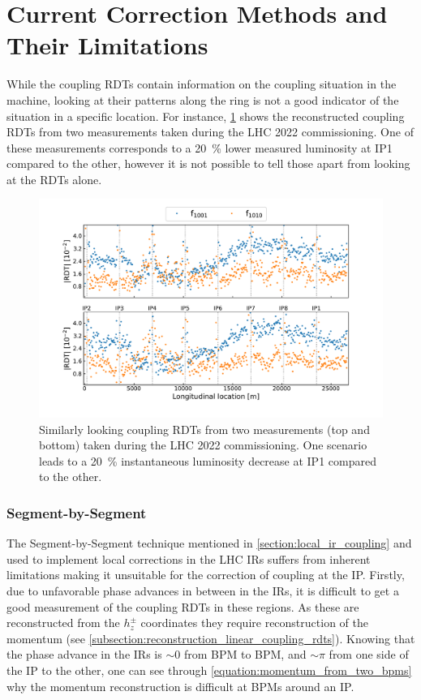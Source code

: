 \section{Current Correction Methods and Their Limitations}
\label{section:current_correction_methods_and_their_limitations}

While the coupling \glspl{RDT} contain information on the coupling situation in the machine, looking at their patterns along the ring is not a good indicator of the situation in a specific location.
For instance, \cref{figure:guess_rdts} shows the reconstructed coupling RDTs from two measurements taken during the LHC \num{2022} commissioning.
One of these measurements corresponds to a \qty{20}{\percent} lower measured luminosity at IP\num{1} compared to the other, however it is not possible to tell those apart from looking at the RDTs alone.

\begin{figure}[!htb]
    \centering
    \includegraphics*[width=\linewidth]{Figures/IR_Coupling_Correction/similar_rdts_different_ip1_lumi.pdf}
    \caption{Similarly looking coupling RDTs from two measurements (top and bottom) taken during the LHC \num{2022} commissioning. One scenario leads to a \qty{20}{\percent} instantaneous luminosity decrease at IP\num{1} compared to the other.}
    \label{figure:guess_rdts}
\end{figure}

\subsubsection*{Segment-by-Segment}

The Segment-by-Segment technique mentioned in \cref{section:local_ir_coupling} and used to implement local corrections in the LHC IRs suffers from inherent limitations making it unsuitable for the correction of coupling at the IP.
Firstly, due to unfavorable phase advances in between  in the IRs, it is difficult to get a good measurement of the coupling RDTs in these regions.
As these are reconstructed from the \(h_z^\pm\) coordinates they require reconstruction of the momentum (see \cref{subsection:reconstruction_linear_coupling_rdts}).
Knowing that the phase advance in the IRs is \(\sim 0\) from BPM to BPM, and \(\sim \pi\) from one side of the IP to the other, one can see through \cref{equation:momentum_from_two_bpms} why the momentum reconstruction is difficult at BPMs around an IP.

